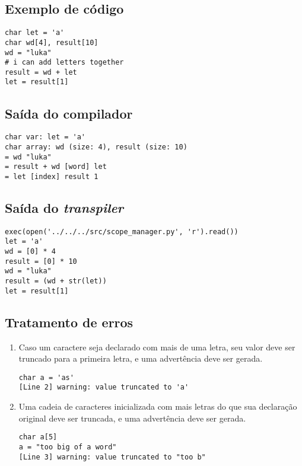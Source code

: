 \documentclass{article}
\newenvironment{smallenum}{
    \vspace{-1mm}
    \begin{enumerate}[label=\roman*.]
    \setlength{\parskip}{0pt}
    \setlength{\itemsep}{2pt}
}{
    \vspace{-2mm}
    \end{enumerate}
}
\begin{document}
\subsection{Exemplo de código}

\begin{verbatim}
char let = 'a'
char wd[4], result[10]
wd = "luka"
# i can add letters together
result = wd + let
let = result[1]
\end{verbatim}

\subsection{Saída do compilador}

\begin{verbatim}
char var: let = 'a'
char array: wd (size: 4), result (size: 10)
= wd "luka"
= result + wd [word] let
= let [index] result 1
\end{verbatim}

\subsection{Saída do \emph{transpiler}}

\begin{verbatim}
exec(open('../../../src/scope_manager.py', 'r').read())
let = 'a'
wd = [0] * 4
result = [0] * 10
wd = "luka"
result = (wd + str(let))
let = result[1]
\end{verbatim}

\subsection{Tratamento de erros}

\begin{smallenum}

\item Caso um caractere seja declarado com mais de uma letra, seu valor deve
    ser truncado para a primeira letra, e uma advertência deve ser gerada.

\begin{verbatim}
char a = 'as'
[Line 2] warning: value truncated to 'a'
\end{verbatim}

\item Uma cadeia de caracteres inicializada com mais letras do que sua
    declaração original deve ser truncada, e uma advertência deve ser gerada.

\begin{verbatim}
char a[5]
a = "too big of a word"
[Line 3] warning: value truncated to "too b"
\end{verbatim}

\end{smallenum}
\end{document}
